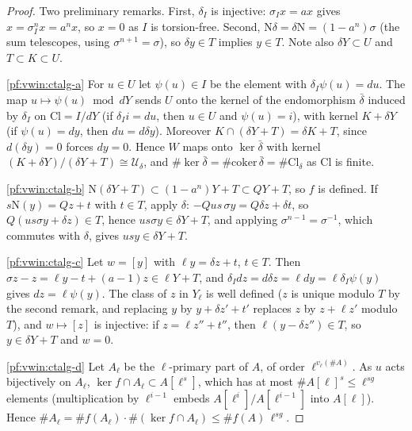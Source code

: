 \begin{proof}
Two preliminary remarks. First, $\delta_I$ is injective: $\sigma_Ix=ax$ gives $x=\sigma_I^nx=a^nx$, so $x=0$ as $I$ is torsion-free.
Second, $\mathrm N\delta=\delta\mathrm N=(1-a^n)\sigma$ (the sum telescopes, using $\sigma^{n+1}=\sigma$), so $\delta y\in T$ implies
$y\in T$. Note also $\delta Y\subset U$ and $T\subset K\subset U$.

\ref{pf:vwin:ctalg-a} For $u\in U$ let $\psi(u)\in I$ be the element with $\delta_I\psi(u)=du$. The map $u\mapsto\psi(u)\bmod dY$ sends
$U$ onto the kernel of the endomorphism $\bar\delta$ induced by $\delta_I$ on $\mathrm{Cl}=I/dY$ (if $\delta_Ii=du$, then $u\in U$
and $\psi(u)=i$), with kernel $K+\delta Y$ (if $\psi(u)=dy$, then $du=d\delta y$). Moreover $K\cap(\delta Y+T)=\delta K+T$, since
$d(\delta y)=0$ forces $dy=0$. Hence $W$ maps onto $\ker\bar\delta$ with kernel $(K+\delta Y)/(\delta Y+T)\cong\mathcal U_\delta$, and
$\#\ker\bar\delta=\#\mathrm{coker}\,\bar\delta=\#\mathrm{Cl}_\delta$ as $\mathrm{Cl}$ is finite.

\ref{pf:vwin:ctalg-b} $\mathrm N(\delta Y+T)\subset(1-a^n)Y+T\subset QY+T$, so $f$ is defined. If $s\mathrm N(y)=Qz+t$ with $t\in T$,
apply $\delta$: $-Qus\,\sigma y=Q\delta z+\delta t$, so $Q(us\sigma y+\delta z)\in T$, hence $us\sigma y\in\delta Y+T$, and applying
$\sigma^{n-1}=\sigma^{-1}$, which commutes with $\delta$, gives $usy\in\delta Y+T$.

\ref{pf:vwin:ctalg-c} Let $w=[y]$ with $\ell y=\delta z+t$, $t\in T$. Then $\sigma z-z=\ell y-t+(a-1)z\in\ell Y+T$, and
$\delta_Idz=d\delta z=\ell dy=\ell\delta_I\psi(y)$ gives $dz=\ell\psi(y)$. The class of $z$ in $Y_\ell$ is well defined ($z$ is unique
modulo $T$ by the second remark, and replacing $y$ by $y+\delta z'+t'$ replaces $z$ by $z+\ell z'$ modulo $T$), and $w\mapsto[z]$ is
injective: if $z=\ell z''+t''$, then $\ell(y-\delta z'')\in T$, so $y\in\delta Y+T$ and $w=0$.

\ref{pf:vwin:ctalg-d} Let $A_\ell$ be the $\ell$-primary part of $A$, of order $\ell^{v_\ell(\#A)}$. As $u$ acts bijectively on $A_\ell$,
$\ker f\cap A_\ell\subset A[\ell^s]$, which has at most $\#A[\ell]^s\le\ell^{sg}$ elements (multiplication by $\ell^{i-1}$ embeds
$A[\ell^i]/A[\ell^{i-1}]$ into $A[\ell]$). Hence $\#A_\ell=\#f(A_\ell)\cdot\#(\ker f\cap A_\ell)\le\#f(A)\,\ell^{sg}$.
\end{proof}

